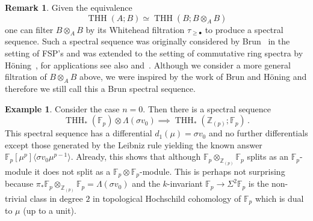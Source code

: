 \documentclass[11pt]{amsart}
\DeclareMathOperator{\THH}{THH}
\theoremstyle{definition}
\newtheorem{example}[equation]{Example}
\newtheorem{remark}[equation]{Remark}
\numberwithin{equation}{section}
\numberwithin{figure}{section}
\begin{document}
\begin{remark}
Given the equivalence  
\[ \THH(A;B)\simeq \THH(B;B\otimes_{A}B)\]
one can filter $B\otimes_{A}B$ by its Whitehead filtration $\tau_{\ge \bullet}$ to produce a spectral sequence. Such a spectral sequence was originally considered by Brun~\cite{Bru00} in the setting of FSP's and was extended to the setting of commutative ring spectra by H\"oning~\cite{Hon20}, for applications see also \cite{Cha25} and~\cite{Hys23}. Although we consider a more general filtration of $B\otimes_{A}B$ above, we were inspired by the work of Brun and H\"oning and therefore we still call this a Brun spectral sequence. 
\end{remark}
\begin{example}
Consider the case $n=0$. Then there is a spectral sequence 
\[ 
\THH_{*}(\mathbb{F}_{p})\otimes \Lambda (\sigma v_{0})\implies \THH_{*}(\mathbb{Z}_{(p)};\mathbb{F}_{p}) \,.
\]
This spectral sequence has a differential $d_{1}(\mu)=\sigma v_{0}$ and no further differentials except those generated by the Leibniz rule yielding the known answer $\mathbb{F}_p[\mu^p]\langle \sigma v_0 \mu^{p-1}\rangle$. 
Already, this shows that although $\mathbb{F}_p\otimes_{\mathbb{Z}_{(p)}}\mathbb{F}_p$ splits as an $\mathbb{F}_p$-module it does not split as a $\mathbb{F}_p\otimes \mathbb{F}_p$-module. This is perhaps not surprising because $\pi_*\mathbb{F}_p\otimes_{\mathbb{Z}_{(p)}}\mathbb{F}_p=\Lambda (\sigma v_0)$ and the $k$-invariant $\mathbb{F}_p\to \Sigma^{2}\mathbb{F}_p$ is the non-trivial class in degree $2$ in topological Hochschild cohomology of $\mathbb{F}_p$ which is dual to $\mu$ (up to a unit).
\end{example}
\end{document}
